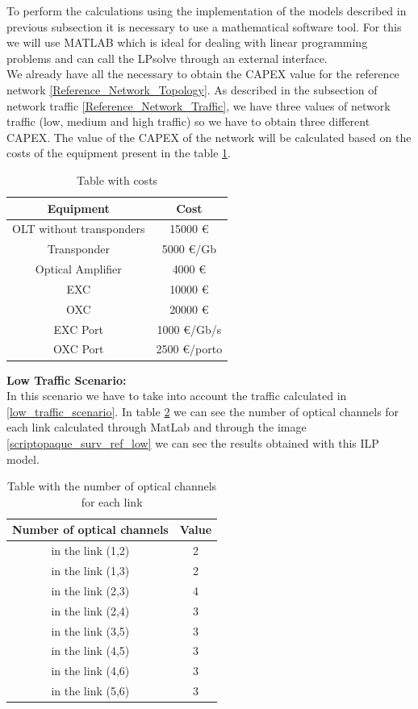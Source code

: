 To perform the calculations using the implementation of the models described in previous subsection it is necessary to use a mathematical software tool. For this we will use MATLAB which is ideal for dealing with linear programming problems and can call the LPsolve through an external interface. \\
We already have all the necessary to obtain the CAPEX value for the reference network \ref{Reference_Network_Topology}. As described in the subsection of network traffic \ref{Reference_Network_Traffic}, we have three values of network traffic (low, medium and high traffic) so we have to obtain three different CAPEX.
The value of the CAPEX of the network will be calculated based on the costs of the equipment present in the table \ref{table_cost2_ilp}.\\

\begin{table}[h!]
\centering
\begin{tabular}{|| c | c||}
 \hline
 Equipment & Cost \\
 \hline\hline
 OLT without transponders & 15000 \euro \\
 Transponder & 5000 \euro/Gb \\
 Optical Amplifier & 4000 \euro \\
 EXC & 10000 \euro \\
 OXC & 20000 \euro \\
 EXC Port & 1000 \euro /Gb/s\\
 OXC Port & 2500 \euro /porto \\
 \hline
\end{tabular}
\caption{Table with costs}
\label{table_cost2_ilp}
\end{table}


\textbf{Low Traffic Scenario:}\\

In this scenario we have to take into account the traffic calculated in \ref{low_traffic_scenario}. In table \ref{result_ILP1P_reference} we can see the number of optical channels for each link calculated through MatLab and through the image \ref{scriptopaque_surv_ref_low} we can see the results obtained with this ILP model.\\

\begin{table}[h!]
\centering
\begin{tabular}{|| c | c||}
 \hline
 Number of optical channels & Value \\
 \hline\hline
 in the link (1,2) & 2 \\
 in the link (1,3) & 2 \\
 in the link (2,3) & 4 \\
 in the link (2,4) & 3 \\
 in the link (3,5) & 3 \\
 in the link (4,5) & 3 \\
 in the link (4,6) & 3 \\
 in the link (5,6) & 3 \\
 \hline
\end{tabular}
\caption{Table with the number of optical channels for each link}
\label{result_ILP1P_reference}
\end{table}
\newpage


